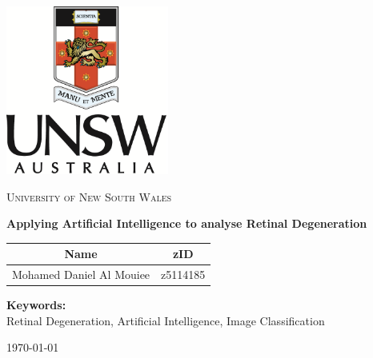 \documentclass[a4paper]{article}
\begin{document}
\begin{titlepage}
\centering
\includegraphics[width=0.4\textwidth]{../img/uni.png}\par\vspace{1cm}
	{\scshape\LARGE University of New South Wales \par}
	\vspace{1cm}
	{\huge\bfseries Applying Artificial Intelligence to analyse Retinal Degeneration\par}
	\vspace{2cm}
    \begin{table}[!h]
    \centering
    \begin{tabular}{||c c||} 
    \hline
    
    \large{\textbf{Name}} & \large{\textbf{zID}} \\ [0.5ex] 
    \hline\hline
    \large{Mohamed Daniel Al Mouiee} &\large{z5114185}\\ 
    \hline
    \end{tabular}
    \end{table}

    \vspace{5cm}
    \textbf{Keywords:} \\
    Retinal Degeneration, Artificial Intelligence, Image Classification
    \vspace{2cm}
    
	\vfill

	{\large \today\par}
\end{titlepage}

\newpage
\tableofcontents
\newpage
\listoffigures
\listoftables
\vfill

\newpage
\end{document}
